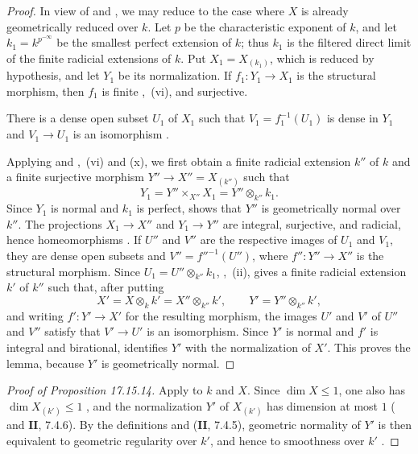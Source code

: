 \begin{proof}
In view of  and , we may reduce to the case where $X$ is already geometrically reduced over $k$.  Let $p$ be the characteristic exponent of $k$, and let $k_1=k^{p^{-\infty}}$ be the smallest perfect extension of $k$; thus $k_1$ is the filtered direct limit of the finite radicial extensions of $k$.  Put $X_1=X_{(k_1)}$, which is reduced by hypothesis, and let $Y_1$ be its normalization.  If $f_1:Y_1\to X_1$ is the structural morphism, then $f_1$ is finite ,~(vi), and surjective.

There is a dense open subset $U_1$ of $X_1$ such that $V_1=f_1^{-1}(U_1)$ is dense in $Y_1$ and $V_1\to U_1$ is an isomorphism .

Applying  and ,~(vi) and (x), we first obtain a finite radicial extension $k''$ of $k$ and a finite surjective morphism $Y''\to X''=X_{(k'')}$ such that
\[
 Y_1=Y''\times_{X''}X_1=Y''\otimes_{k''}k_1.
\]
Since $Y_1$ is normal and $k_1$ is perfect,  shows that $Y''$ is geometrically normal over $k''$.  The projections $X_1\to X''$ and $Y_1\to Y''$ are integral, surjective, and radicial, hence homeomorphisms .  If $U''$ and $V''$ are the respective images of $U_1$ and $V_1$, they are dense open subsets and $V''=f''^{-1}(U'')$, where $f'':Y''\to X''$ is the structural morphism.  Since $U_1=U''\otimes_{k''}k_1$, ,~(ii), gives a finite radicial extension $k'$ of $k''$ such that, after putting
\[
 X'=X\otimes_k k'=X''\otimes_{k''}k',\qquad
 Y'=Y''\otimes_{k''}k',
\]
and writing $f':Y'\to X'$ for the resulting morphism, the images $U'$ and $V'$ of $U''$ and $V''$ satisfy that $V'\to U'$ is an isomorphism.  Since $Y'$ is normal and $f'$ is integral and birational,  identifies $Y'$ with the normalization of $X'$.  This proves the lemma, because $Y'$ is geometrically normal.
\end{proof}

\begin{proof}[Proof of Proposition \textup{17.15.14}]
Apply  to $k$ and $X$.  Since $\dim X\leq1$, one also has $\dim X_{(k')}\leq1$ , and the normalization $Y'$ of $X_{(k')}$ has dimension at most $1$ ( and $\mathbf{II}$, 7.4.6).  By the definitions and ($\mathbf{II}$, 7.4.5), geometric normality of $Y'$ is then equivalent to geometric regularity over $k'$, and hence to smoothness over $k'$ .
\end{proof}

